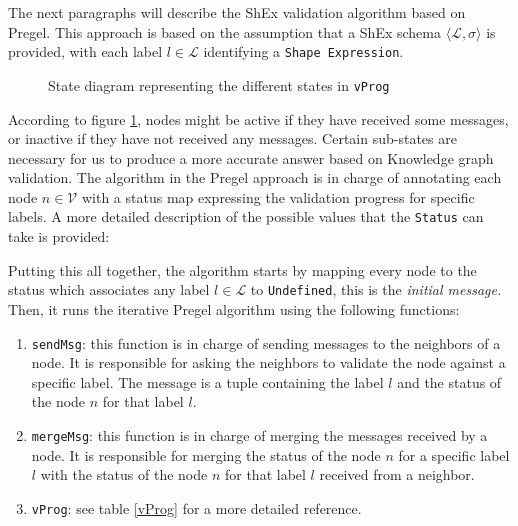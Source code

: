 The next paragraphs will describe the ShEx validation algorithm based on Pregel. This approach is based on the assumption that a ShEx schema $\langle  \mathcal{L},\sigma \rangle$ is provided,  with each label $l \in \mathcal{L}$ identifying a \texttt{Shape Expression}.

\begin{figure}[H]
    \centering
    
    \caption[State diagram representing the different states in \texttt{vProg}]{State diagram representing the different states in \texttt{vProg}~\cite{https://doi.org/10.48550/arxiv.2110.11709}}
    \label{fig:state:pregel}
\end{figure}

According to figure \ref{fig:state:pregel}, nodes might be active if they have received some messages, or inactive if they have not received any messages. Certain sub-states are necessary for us to produce a more accurate answer based on Knowledge graph validation. The algorithm in the Pregel approach is in charge of annotating each node $n\in\mathcal{V}$ with a status map expressing the validation progress for specific labels. A more detailed description of the possible values that the \texttt{Status} can take is provided:

\begin{center}
    
\end{center}

Putting this all together, the algorithm starts by mapping every node to the status which associates any label $l \in \mathcal{L}$ to \texttt{Undefined}, this is the \textit{initial message.} Then, it runs the iterative Pregel algorithm using the following functions:

\begin{enumerate}
    \itemsep0.5em
    \item \texttt{sendMsg}: this function is in charge of sending messages to the neighbors of a node. It is responsible for asking the neighbors to validate the node against a specific label. The message is a tuple containing the label $l$ and the status of the node $n$ for that label $l$.
    \item \texttt{mergeMsg}: this function is in charge of merging the messages received by a node. It is responsible for merging the status of the node $n$ for a specific label $l$ with the status of the node $n$ for that label $l$ received from a neighbor.
    \item \texttt{vProg}: see table \ref{vProg} for a more detailed reference.
\end{enumerate}

